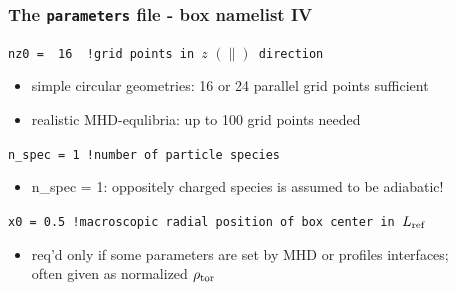 \documentclass[9pt]{beamer}
\begin{document}
\begin{frame}[fragile]
  \frametitle{The {\tt parameters} file - box namelist IV}
\begin{block}%

\begin{block}

\verb|nz0 =  16  !grid points in |$z\,\,(\parallel)$\verb| direction|
\end{block}
\begin{itemize}
\item simple circular geometries: 16 or 24 parallel grid points sufficient
\item realistic MHD-equlibria: up to 100 grid points needed
\end{itemize}
\begin{block}

\verb|n_spec = 1 !number of particle species|
\end{block}
\begin{itemize}
\item n\_spec = 1: oppositely charged species is assumed to be adiabatic!
\end{itemize}
\begin{block}

\verb|x0 = 0.5 !macroscopic radial position of box center in |$L_{\rm ref}$
\end{block}
\begin{itemize}
\item req'd only if some parameters are set by MHD or profiles interfaces;\\
often given as normalized $\rho_{\rm tor}$
\end{itemize}

\end{block}
\end{frame}


\end{document}
